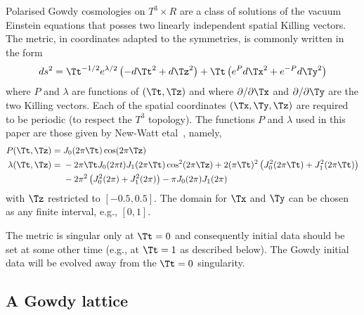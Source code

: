 \documentclass[a4paper,12pt]{article}
\numberwithin{equation}{section}
\begin{document}
Polarised Gowdy cosmologies on $T^3\times R$ are a class of solutions of the vacuum Einstein
equations that posses two linearly independent spatial Killing vectors. The metric, in
coordinates adapted to the symmetries, is commonly written in the form~\cite{new-kc:1998-01,alcubierre:2004-02}
\begin{align}
   \label{eqn:GowdyMetric}
   ds^2 = \Tt^{-1/2} e^{\lambda/2}\left(-d\Tt^2+d\Tz^2\right)
        + \Tt\left(e^{P}d\Tx^2+e^{-P}d\Ty^2\right)
\end{align}
where $P$ and $\lambda$ are functions of $(\Tt,\Tz)$ and where $\partial/\partial\Tx$ and
$\partial/\partial\Ty$ are the two Killing vectors. Each of the spatial coordinates
$(\Tx,\Ty,\Tz)$ are required to be periodic (to respect the $T^3$ topology). The functions
$P$ and $\lambda$ used in this paper are those given by New-Watt etal~\cite{new-kc:1998-01},
namely,
\begin{align}
   \label{eqn:GowdyExactA}
   P (\Tt,\Tz) ={}& J_0(2\pi \Tt)\cos(2\pi \Tz)\\
   \label{eqn:GowdyExactB}
   \lambda (\Tt,\Tz) ={}&
                  -2\pi \Tt J_0(2\pi t) J_1(2\pi \Tt)\cos^2(2\pi \Tz)
                  + 2(\pi \Tt)^2\left(J^2_0(2\pi \Tt)+J^2_1(2\pi \Tt)\right)\notag\\
                 &-2\pi^2\left(J^2_0(2\pi)+J^2_1(2\pi)\right)
                  -\pi J_0(2\pi) J_1(2\pi)
\end{align}
with $\Tz$ restricted to $\left[-0.5,0.5\right]$. The domain for $\Tx$ and $\Ty$ can be
chosen as any finite interval, e.g., $\left[0,1\right]$.

The metric is singular only at $\Tt=0$ and consequently initial data should be set at some
other time (e.g., at $\Tt=1$ as described below). The Gowdy initial data will be evolved away
from the $\Tt=0$ singularity.

\subsection{A Gowdy lattice}
\label{sec:GowdyLattice}
\end{document}
